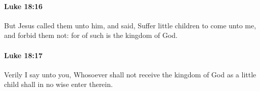 		\paragraph{Luke 18:16} %
			\label{LUKE-18-16}

			But Jesus called them unto him, and said, Suffer little children to come unto me, and forbid them not: for of such is the kingdom of God.

			\begin{framed}
			\scriptsize
				\begin{compactdesc}
					\item[SBLG] 
				\end{compactdesc}
			\end{framed}

		\paragraph{Luke 18:17} %
			\label{LUKE-18-17}

			Verily I say unto you, Whosoever shall not receive the kingdom of God as a little child shall in no wise enter therein.

